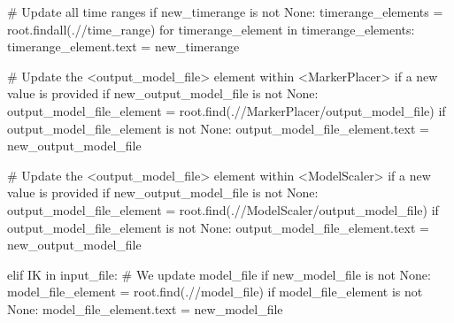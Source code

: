 \documentclass[
  letterpaper,
  DIV=11,
  numbers=noendperiod]{scrreprt}
\newenvironment{Shaded}{\begin{snugshade}}{\end{snugshade}}
\newcommand{\CommentTok}[1]{\textcolor[rgb]{0.37,0.37,0.37}{#1}}
\newcommand{\ControlFlowTok}[1]{\textcolor[rgb]{0.00,0.23,0.31}{#1}}
\newcommand{\KeywordTok}[1]{\textcolor[rgb]{0.00,0.23,0.31}{#1}}
\newcommand{\NormalTok}[1]{\textcolor[rgb]{0.00,0.23,0.31}{#1}}
\newcommand{\OperatorTok}[1]{\textcolor[rgb]{0.37,0.37,0.37}{#1}}
\newcommand{\StringTok}[1]{\textcolor[rgb]{0.13,0.47,0.30}{#1}}
\newcommand{\VariableTok}[1]{\textcolor[rgb]{0.07,0.07,0.07}{#1}}
\begin{document}
\begin{Shaded}
\begin{Highlighting}[]
        \CommentTok{\# Update all time ranges}
        \ControlFlowTok{if}\NormalTok{ new\_timerange }\KeywordTok{is} \KeywordTok{not} \VariableTok{None}\NormalTok{:}
\NormalTok{            timerange\_elements }\OperatorTok{=}\NormalTok{ root.findall(}\StringTok{\textquotesingle{}.//time\_range\textquotesingle{}}\NormalTok{)}
            \ControlFlowTok{for}\NormalTok{ timerange\_element }\KeywordTok{in}\NormalTok{ timerange\_elements:}
\NormalTok{                timerange\_element.text }\OperatorTok{=}\NormalTok{ new\_timerange}

        \CommentTok{\# Update the \textless{}output\_model\_file\textgreater{} element within \textless{}MarkerPlacer\textgreater{} if a new value is provided}
        \ControlFlowTok{if}\NormalTok{ new\_output\_model\_file }\KeywordTok{is} \KeywordTok{not} \VariableTok{None}\NormalTok{:}
\NormalTok{            output\_model\_file\_element }\OperatorTok{=}\NormalTok{ root.find(}\StringTok{\textquotesingle{}.//MarkerPlacer/output\_model\_file\textquotesingle{}}\NormalTok{)}
            \ControlFlowTok{if}\NormalTok{ output\_model\_file\_element }\KeywordTok{is} \KeywordTok{not} \VariableTok{None}\NormalTok{:}
\NormalTok{                output\_model\_file\_element.text }\OperatorTok{=}\NormalTok{ new\_output\_model\_file}

        \CommentTok{\# Update the \textless{}output\_model\_file\textgreater{} element within \textless{}ModelScaler\textgreater{} if a new value is provided}
        \ControlFlowTok{if}\NormalTok{ new\_output\_model\_file }\KeywordTok{is} \KeywordTok{not} \VariableTok{None}\NormalTok{:}
\NormalTok{            output\_model\_file\_element }\OperatorTok{=}\NormalTok{ root.find(}\StringTok{\textquotesingle{}.//ModelScaler/output\_model\_file\textquotesingle{}}\NormalTok{)}
            \ControlFlowTok{if}\NormalTok{ output\_model\_file\_element }\KeywordTok{is} \KeywordTok{not} \VariableTok{None}\NormalTok{:}
\NormalTok{                output\_model\_file\_element.text }\OperatorTok{=}\NormalTok{ new\_output\_model\_file}
    
    \ControlFlowTok{elif} \StringTok{\textquotesingle{}IK\textquotesingle{}} \KeywordTok{in}\NormalTok{ input\_file:}
        \CommentTok{\# We update model\_file}
        \ControlFlowTok{if}\NormalTok{ new\_model\_file }\KeywordTok{is} \KeywordTok{not} \VariableTok{None}\NormalTok{:}
\NormalTok{            model\_file\_element }\OperatorTok{=}\NormalTok{ root.find(}\StringTok{\textquotesingle{}.//model\_file\textquotesingle{}}\NormalTok{)}
            \ControlFlowTok{if}\NormalTok{ model\_file\_element }\KeywordTok{is} \KeywordTok{not} \VariableTok{None}\NormalTok{:}
\NormalTok{                model\_file\_element.text }\OperatorTok{=}\NormalTok{ new\_model\_file}


\end{Highlighting}
\end{Shaded}
\end{document}
